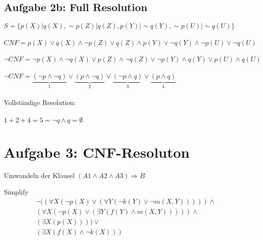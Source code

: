 \documentclass{article}
\begin{document}
\subsection*{Aufgabe 2b: Full Resolution}

$S = \{ p(X) | q(X) , \sim p(Z) | q(Z) , p(Y) | \sim q(Y) , \sim p(U) | \sim q(U) \}$\\
\\
$CNF = p(X) \vee q(X) \wedge \neg p(Z) \vee q(Z) \wedge p(Y) \vee \neg q(Y) \wedge \neg p(U) \vee \neg q(U)$\\
\\
$\neg CNF = \neg p(X) \wedge \neg q(X) \vee p(Z) \wedge \neg q(Z) \vee \neg p(Y) \wedge q(Y) \vee p(U) \wedge q(U)$\\
\\
$\neg CNF = \underbrace{(\neg p \wedge \neg q)}_{1} \vee \underbrace{(p \wedge \neg q)}_{2} \vee \underbrace{(\neg p \wedge q)}_{3} \vee \underbrace{(p \wedge q)}_{4}$\\
\\
Vollständige Resolution:\\
\\
$1+2+4 = 5 = \neg q \wedge q = \emptyset$\\
\newpage

\section*{Aufgabe 3: CNF-Resoluton}

Umwandeln der Klausel $(A1 \land A2 \land A3) \Rightarrow B$

Simplify
\begin{equation*}
\begin{aligned}
\lnot (( \forall X (\lnot p(X) \lor ( \forall Y ( \lnot k(Y) \lor \lnot m(X,Y))))) \land \\
(\forall X ( \lnot p(X) \lor ( \exists Y ( f(Y) \land m(X,Y)))) ) \land \\
(\exists X (p(X)))) \lor \\
( \exists X (f(X) \land \lnot k(X)) )
\end{aligned}
\end{equation*}
\end{document}
